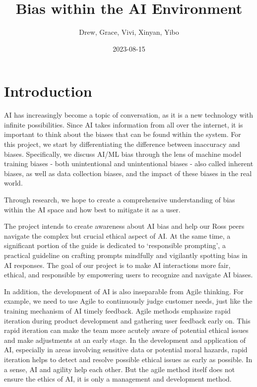 \documentclass[
]{book}
\title{Bias within the AI Environment}
\author{Drew, Grace, Vivi, Xinyan, Yibo}
\date{2023-08-15}
\begin{document}
\maketitle

{
\setcounter{tocdepth}{1}
\tableofcontents
}
\hypertarget{introduction}{%
\chapter{Introduction}\label{introduction}}

AI has increasingly become a topic of conversation, as it is a new technology with infinite possibilities. Since AI takes information from all over the internet, it is important to think about the biases that can be found within the system. For this project, we start by differentiating the difference between inaccuracy and biases. Specifically, we discuss AI/ML bias through the lens of machine model training biases - both unintentional and unintentional biases - also called inherent biases, as well as data collection biases, and the impact of these biases in the real world.

Through research, we hope to create a comprehensive understanding of bias within the AI space and how best to mitigate it as a user.

The project intends to create awareness about AI bias and help our Ross peers navigate the complex but crucial ethical aspect of AI. At the same time, a significant portion of the guide is dedicated to `responsible prompting', a practical guideline on crafting prompts mindfully and vigilantly spotting bias in AI responses. The goal of our project is to make AI interactions more fair, ethical, and responsible by empowering users to recognize and navigate AI biases.

In addition, the development of AI is also inseparable from Agile thinking. For example, we need to use Agile to continuously judge customer needs, just like the training mechanism of AI timely feedback. Agile methods emphasize rapid iteration during product development and gathering user feedback early on. This rapid iteration can make the team more acutely aware of potential ethical issues and make adjustments at an early stage. In the development and application of AI, especially in areas involving sensitive data or potential moral hazards, rapid iteration helps to detect and resolve possible ethical issues as early as possible. In a sense, AI and agility help each other. But the agile method itself does not ensure the ethics of AI, it is only a management and development method.
\end{document}
